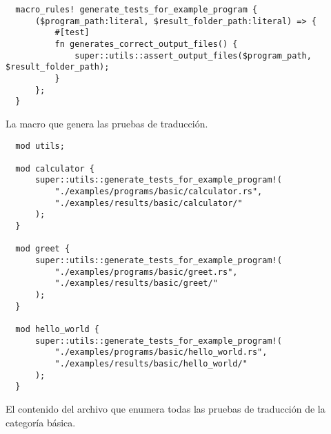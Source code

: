 \begin{listing}[!htbp]
  \begin{verbatim}
  macro_rules! generate_tests_for_example_program {
      ($program_path:literal, $result_folder_path:literal) => {
          #[test]
          fn generates_correct_output_files() {
              super::utils::assert_output_files($program_path, $result_folder_path);
          }
      };
  }        
  \end{verbatim}
  \caption{La macro que genera las pruebas de traducción.}
  \label{lst:macro-test-generation}
\end{listing}


\begin{listing}[!htbp]
  \begin{verbatim}
  mod utils;
  
  mod calculator {
      super::utils::generate_tests_for_example_program!(
          "./examples/programs/basic/calculator.rs",
          "./examples/results/basic/calculator/"
      );
  }
  
  mod greet {
      super::utils::generate_tests_for_example_program!(
          "./examples/programs/basic/greet.rs",
          "./examples/results/basic/greet/"
      );
  }
  
  mod hello_world {
      super::utils::generate_tests_for_example_program!(
          "./examples/programs/basic/hello_world.rs",
          "./examples/results/basic/hello_world/"
      );
  }    
  \end{verbatim}
  \caption{El contenido del archivo  que enumera
    todas las pruebas de traducción de la categoría básica.}
  \label{lst:macro-test-generation-example}
\end{listing}

